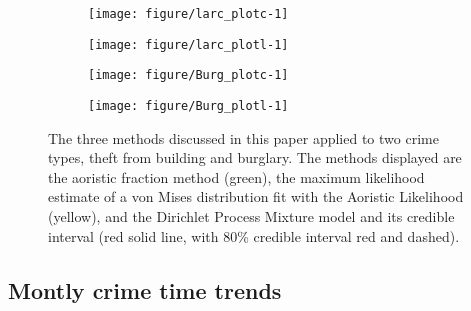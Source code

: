 \begin{figure}
\centering
\begin{subfigure}[b]{0.4\linewidth}
\centering
\begin{knitrout}
\color{fgcolor}
\texttt{[image: figure/larc\_plotc-1]} 

\end{knitrout}
\end{subfigure}%
\begin{subfigure}[b]{0.6\linewidth}
\centering
\begin{knitrout}
\color{fgcolor}
\texttt{[image: figure/larc\_plotl-1]} 

\end{knitrout}
\end{subfigure}\newline%
\begin{subfigure}[b]{0.4\linewidth}
\centering
\begin{knitrout}
\color{fgcolor}
\texttt{[image: figure/Burg\_plotc-1]} 

\end{knitrout}
\end{subfigure}%
\begin{subfigure}[b]{0.6\linewidth}
\centering
\begin{knitrout}
\color{fgcolor}
\texttt{[image: figure/Burg\_plotl-1]} 

\end{knitrout}
\end{subfigure}%
\caption{The three methods discussed in this paper applied to two crime types, theft from building and burglary. The methods displayed are the aoristic fraction method (green), the maximum likelihood estimate of a von Mises distribution fit with the Aoristic Likelihood (yellow), and the Dirichlet Process Mixture model and its credible interval (red solid line, with 80\% credible interval red and dashed).} \label{mont_plots}
\end{figure}


\subsection{Montly crime time trends}


